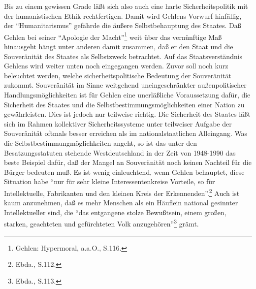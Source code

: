 \documentclass[12pt,a4paper]{article}
\begin{document}
Bis zu einem gewissen Grade läßt sich also auch eine harte Sicherheitspolitik
mit der humanistischen Ethik rechtfertigen. Damit wird Gehlens Vorwurf
hinfällig, der "`Humanitarismus"' gefährde die äußere Selbstbehauptung des
Staates. Daß Gehlen bei seiner "`Apologie der Macht"'\footnote{Gehlen:
Hypermoral, a.a.O., S.116.} weit über das vernünftige Maß hinausgeht hängt
unter anderen damit zusammen, daß er den Staat und die Souveränität des
Staates als Selbstzweck betrachtet. Auf das Staatsverständnis Gehlens wird
weiter unten noch eingegangen werden. Zuvor soll noch kurz beleuchtet werden,
welche sicherheitspolitische Bedeutung der Souveränität zukommt.
Souveränität im Sinne weitgehend uneingeschränkter außenpolitischer
Handlungsmöglichkeiten ist für Gehlen eine unerläßliche Voraussetzung dafür,
die Sicherheit des Staates und die Selbstbestimmungsmöglichkeiten einer
Nation zu gewährleisten. Dies ist jedoch nur teilweise richtig. Die
Sicherheit des Staates läßt sich im Rahmen kollektiver Sicherheitssysteme
unter teilweiser Aufgabe der Souveränität oftmals besser erreichen als im
nationalstaatlichen Alleingang. Was die Selbstbestimmungmöglichkeiten angeht,
so ist das unter den Besatzungsstatuten stehende Westdeutschland in der Zeit
von 1948-1990 das beste Beispiel dafür, daß der Mangel an Souveränität noch
keinen Nachteil für die Bürger bedeuten muß. Es ist wenig einleuchtend, wenn
Gehlen behauptet, diese Situation habe "`nur für sehr kleine
Interessentenkreise Vorteile, so für Intellektuelle, Fabrikanten und den
kleinen Kreis der Erkennenden"'.\footnote{Ebda., S.112.} Auch ist kaum
anzunehmen, daß es mehr Menschen als ein Häuflein national gesinnter
Intellektueller sind, die "`das entgangene stolze Bewußtsein, einem großen,
starken, geachteten und gefürchteten Volk anzugehören"'\footnote{Ebda.,
S.113.} grämt.
\end{document}
